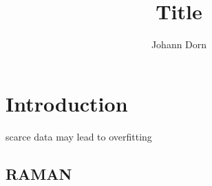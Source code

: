\documentclass[a4paper]{article}
\title{Title}
\author{Johann Dorn}
\begin{document}
\maketitle
\iffalse
my notes
\fi

\section{Introduction}
scarce data may lead to overfitting\cite{Lecun1995conv}
\subsection{RAMAN}
\clearpage
\end{document}

